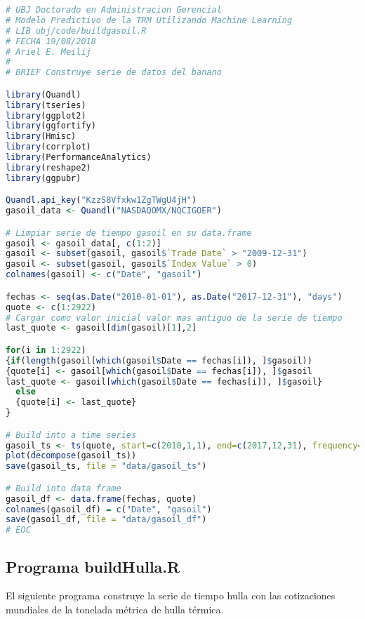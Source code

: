 \begin{lstlisting}[language=R]
# UBJ Doctorado en Administracion Gerencial
# Modelo Predictivo de la TRM Utilizando Machine Learning
# LIB ubj/code/buildgasoil.R 
# FECHA 19/08/2018
# Ariel E. Meilij
#
# BRIEF Construye serie de datos del banano

library(Quandl)
library(tseries)
library(ggplot2)
library(ggfortify)
library(Hmisc)
library(corrplot)
library(PerformanceAnalytics)
library(reshape2)
library(ggpubr)

Quandl.api_key("KzzS8Vfxkw1ZgTWgU4jH")
gasoil_data <- Quandl("NASDAQOMX/NQCIGOER")

# Limpiar serie de tiempo gasoil en su data.frame
gasoil <- gasoil_data[, c(1:2)]
gasoil <- subset(gasoil, gasoil$`Trade Date` > "2009-12-31")
gasoil <- subset(gasoil, gasoil$`Index Value` > 0)
colnames(gasoil) <- c("Date", "gasoil")

fechas <- seq(as.Date("2010-01-01"), as.Date("2017-12-31"), "days")
quote <- c(1:2922)
# Cargar como valor inicial valor mas antiguo de la serie de tiempo
last_quote <- gasoil[dim(gasoil)[1],2]

for(i in 1:2922)
{if(length(gasoil[which(gasoil$Date == fechas[i]), ]$gasoil))
{quote[i] <- gasoil[which(gasoil$Date == fechas[i]), ]$gasoil
last_quote <- gasoil[which(gasoil$Date == fechas[i]), ]$gasoil}
  else
  {quote[i] <- last_quote}
}

# Build into a time series
gasoil_ts <- ts(quote, start=c(2010,1,1), end=c(2017,12,31), frequency=365)
plot(decompose(gasoil_ts))
save(gasoil_ts, file = "data/gasoil_ts")

# Build into data frame
gasoil_df <- data.frame(fechas, quote)
colnames(gasoil_df) = c("Date", "gasoil")
save(gasoil_df, file = "data/gasoil_df")
# EOC
\end{lstlisting}

\subsection{Programa buildHulla.R}
El siguiente programa construye la serie de tiempo hulla con las cotizaciones mundiales de la tonelada métrica de hulla térmica. 

